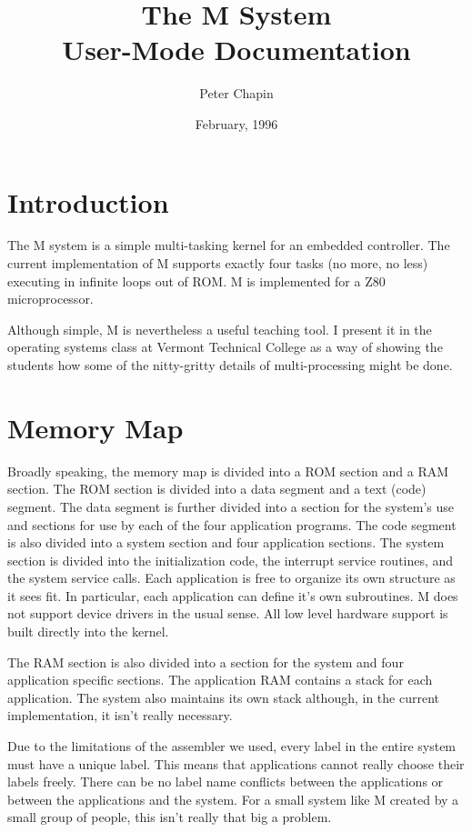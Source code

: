 \documentclass{article}
\begin{document}
\title{The M System\\
       User-Mode Documentation}
\author{Peter Chapin}
\date{February, 1996}
\maketitle

\section{Introduction}

The M system is a simple multi-tasking kernel for an embedded controller. The current
implementation of M supports exactly four tasks (no more, no less) executing in infinite loops
out of ROM. M is implemented for a Z80 microprocessor.

Although simple, M is nevertheless a useful teaching tool. I present it in the operating systems
class at Vermont Technical College as a way of showing the students how some of the nitty-gritty
details of multi-processing might be done.

\section{Memory Map}

Broadly speaking, the memory map is divided into a ROM section and a RAM section. The ROM
section is divided into a data segment and a text (code) segment. The data segment is further
divided into a section for the system's use and sections for use by each of the four application
programs. The code segment is also divided into a system section and four application sections.
The system section is divided into the initialization code, the interrupt service routines, and
the system service calls. Each application is free to organize its own structure as it sees fit.
In particular, each application can define it's own subroutines. M does not support device
drivers in the usual sense. All low level hardware support is built directly into the kernel.

The RAM section is also divided into a section for the system and four application specific
sections. The application RAM contains a stack for each application. The system also maintains
its own stack although, in the current implementation, it isn't really necessary.

Due to the limitations of the assembler we used, every label in the entire system must have a
unique label. This means that applications cannot really choose their labels freely. There can
be no label name conflicts between the applications or between the applications and the system.
For a small system like M created by a small group of people, this isn't really that big a
problem.
\end{document}
